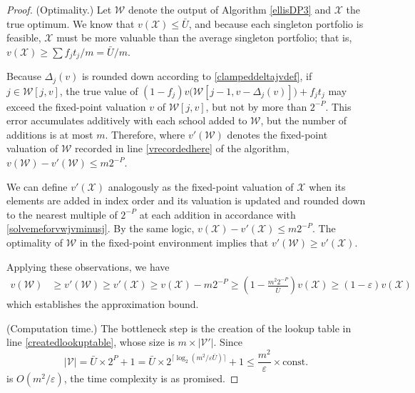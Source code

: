 \documentclass[11pt]{article} %
\theoremstyle{definition}
\begin{document}
\begin{proof}
(Optimality.) Let $\mathcal{W}$ denote the output of Algorithm \ref{ellisDP3} and $\mathcal{X}$ the true optimum. We know that $v(\mathcal{X}) \leq \bar U$, and because each singleton portfolio is feasible, $\mathcal{X}$ must be more valuable than the average singleton portfolio; that is, $v(\mathcal{X}) \geq \sum f_j t_j / m = \bar U / m$.

Because $\Delta_j(v)$ is rounded down according to \eqref{clampeddeltajvdef}, if $j \in \mathcal{W}[j, v]$, the true value of $(1 - f_j) v\bigl(\mathcal{W}[j-1, v- \Delta_j(v)]\bigr) + f_j t_j$ may exceed the fixed-point valuation $v$ of $\mathcal{W}[j, v]$, but not by more than $2^{-P}$. This error accumulates additively with each school added to $\mathcal{W}$, but the number of additions is at most $m$. Therefore, where $v'(\mathcal{W})$ denotes the fixed-point valuation of $\mathcal{W}$ recorded in line \ref{vrecordedhere} of the algorithm, 
$v(\mathcal{W}) - v'(\mathcal{W}) \leq m 2^{-P}$.

We can define $v'(\mathcal{X})$ analogously as the fixed-point valuation of $\mathcal{X}$ when its elements are added in index order and its valuation is updated and rounded down to the nearest multiple of $2^{-P}$ at each addition in accordance with \eqref{solvemeforvwjvminusj}. By the same logic, 
$v(\mathcal{X}) - v'(\mathcal{X}) \leq m 2^{-P}$. The optimality of $\mathcal{W}$ in the fixed-point environment implies that $v'(\mathcal{W}) \geq v'(\mathcal{X})$. 

Applying these observations, we have
\begin{equation}
\begin{split}
v(\mathcal{W}) &\geq v'(\mathcal{W}) \geq v'(\mathcal{X})
\geq v(\mathcal{X}) - m 2^{-P}
\geq \left(1 - \frac{m^2 2^{-P}}{\bar U}\right) v(\mathcal{X})
\geq \left(1 - \varepsilon\right) v(\mathcal{X})
\end{split}
\end{equation}
which establishes the approximation bound. 

(Computation time.) The bottleneck step is the creation of the lookup table in line \ref{createdlookuptable}, whose size is $m \times |\mathcal{V}'|$. Since
\begin{equation}
|\mathcal{V}| = \bar U \times 2^{P} + 1 = \bar U \times 2^ { \bigl\lceil\log_{2}\left(m ^2/ \varepsilon \bar U\right)\bigr\rceil} + 1
\leq\frac{m^2}{\varepsilon} \times \text{const.}
\end{equation}
is $O(m^2/ \varepsilon)$, the time complexity is as promised.
\end{proof}
\end{document}
